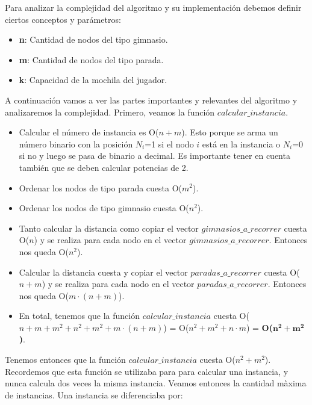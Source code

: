 \par Para analizar la complejidad del algoritmo y su implementación debemos definir ciertos conceptos y parámetros:

\begin{itemize}
	\item \textbf{n}: Cantidad de nodos del tipo gimnasio.
	\item \textbf{m}: Cantidad de nodos del tipo parada.
	\item \textbf{k}: Capacidad de la mochila del jugador.
\end{itemize}

\par A continuación vamos a ver las partes importantes y relevantes del algoritmo y analizaremos la complejidad. Primero, veamos la función $calcular\_instancia$.

\begin{itemize}
	\item Calcular el número de instancia es O($n+m$). Esto porque se arma un número binario con la posición $N_i$=1 si el nodo $i$ está en la instancia o $N_i$=0 si no y luego se pasa de binario a decimal. Es importante tener en cuenta también que se deben calcular potencias de 2.
	\item Ordenar los nodos de tipo parada cuesta O($m^2$).
	\item Ordenar los nodos de tipo gimnasio cuesta O($n^2$).
	\item Tanto calcular la distancia como copiar el vector $gimnasios\_a\_recorrer$ cuesta O($n$) y se realiza para cada nodo en el vector $gimnasios\_a\_recorrer$. Entonces nos queda O($n^2$).
	\item Calcular la distancia cuesta y copiar el vector $paradas\_a\_recorrer$ cuesta O($n+m$) y se realiza para cada nodo en el vector $paradas\_a\_recorrer$. Entonces nos queda O($m \cdot (n+m)$).
	\item En total, tenemos que la función $calcular\_instancia$ cuesta O($n+m + m^2 + n^2 + m^2 + m \cdot (n+m)$) = O($n^2 + m^2 + n \cdot m$) = \textbf{O($\boldsymbol{n^2 + m^2}$)}.
\end{itemize}

\par Tenemos entonces que la función $calcular\_instancia$ cuesta O($n^2 + m^2$). Recordemos que esta función se utilizaba para para calcular una instancia, y nunca calcula dos veces la misma instancia. Veamos entonces la cantidad màxima de instancias. Una instancia se diferenciaba por:

